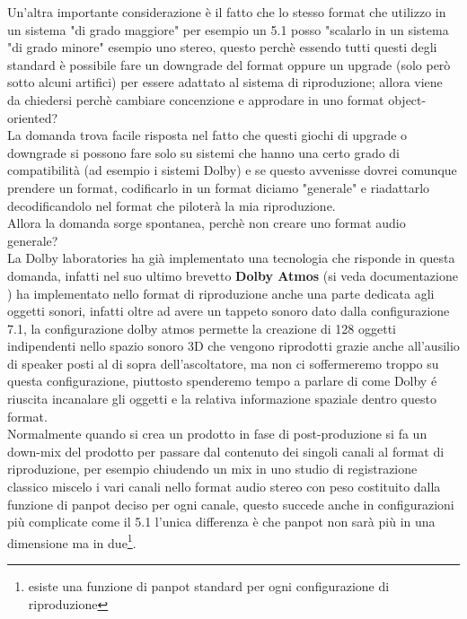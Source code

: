 \documentclass[12pt,a4paper]{report}
\begin{document}
Un'altra importante considerazione è il fatto che lo stesso format che utilizzo in un sistema "di grado maggiore" per esempio un 5.1 posso "scalarlo in un sistema "di grado minore" esempio uno stereo, questo perchè essendo tutti questi degli standard è possibile fare un downgrade del format oppure un upgrade (solo però sotto alcuni artifici) per essere adattato al sistema di riproduzione; allora viene da chiedersi perchè cambiare concenzione e approdare in uno format object-oriented?\\

La domanda trova facile risposta nel fatto che questi giochi di upgrade o downgrade si possono fare solo su sistemi che hanno una certo grado di compatibilità (ad esempio i sistemi Dolby) e se questo avvenisse dovrei comunque prendere un format, codificarlo in un format diciamo "generale" e riadattarlo decodificandolo nel format che piloterà la mia riproduzione.\\

Allora la domanda sorge spontanea, perchè non creare uno format audio generale?\\

La Dolby laboratories ha già implementato una tecnologia che risponde in questa domanda, infatti nel suo ultimo brevetto \textbf{Dolby Atmos} (si veda documentazione \cite{atmos}) ha implementato nello format di riproduzione anche una parte dedicata agli oggetti sonori, infatti oltre ad avere un tappeto sonoro dato dalla configurazione 7.1, la configurazione dolby atmos permette la creazione di 128 oggetti indipendenti nello spazio sonoro 3D che vengono riprodotti grazie anche all'ausilio di speaker posti al di sopra dell'ascoltatore, ma non ci soffermeremo troppo su questa configurazione, piuttosto spenderemo tempo a parlare di come Dolby é riuscita incanalare gli oggetti e la relativa informazione spaziale dentro questo format.\\

Normalmente quando si crea un prodotto in fase di post-produzione si fa un down-mix del prodotto per passare dal contenuto dei singoli canali al format di riproduzione, per esempio chiudendo un mix in uno studio di registrazione classico miscelo i vari canali nello format audio stereo con peso costituito dalla funzione di panpot deciso per ogni canale, questo succede anche in configurazioni più complicate come il 5.1 l'unica differenza è che panpot non sarà più in una dimensione ma in due\footnote{esiste una funzione di panpot standard per ogni configurazione di riproduzione}.\\
\end{document}
